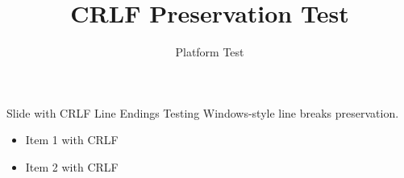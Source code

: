 \documentclass{beamer}
\title{CRLF Preservation Test}
\author{Platform Test}
\begin{document}
\begin{frame}{Slide with CRLF Line Endings}
  Testing Windows-style line breaks preservation.
  \begin{itemize}
    \item Item 1 with CRLF
    \item Item 2 with CRLF
  \end{itemize}
\end{frame}
\end{document}
